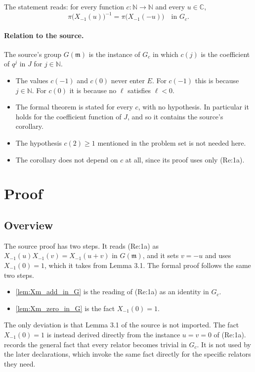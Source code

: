 \documentclass[11pt]{article}
\theoremstyle{definition}
\theoremstyle{remark}
\begin{document}
The statement reads: for every function $c:\mathbb{N}\to\mathbb{N}$ and every $u\in\mathbb{C}$,
\[
\pi\bigl(X_{-1}(u)\bigr)^{-1}=\pi\bigl(X_{-1}(-u)\bigr)\quad\text{in } G_c.
\]

\paragraph{Relation to the source.} The source's group $G(\mathfrak{m})$ is the instance of $G_c$ in which $c(j)$ is the coefficient of $q^j$ in $J$ for $j\in\mathbb{N}$.
\begin{itemize}
\item The values $c(-1)$ and $c(0)$ never enter $E$. For $c(-1)$ this is because $j\in\mathbb{N}$. For $c(0)$ it is because no $\ell$ satisfies $\ell<0$.
\item The formal theorem is stated for every $c$, with no hypothesis. In particular it holds for the coefficient function of $J$, and so it contains the source's corollary.
\item The hypothesis $c(2)\geq 1$ mentioned in the problem set is not needed here.
\item The corollary does not depend on $c$ at all, since its proof uses only (Re:1a).
\end{itemize}

\section{Proof}

\subsection{Overview}

The source proof has two steps. It reads (Re:1a) as $X_{-1}(u)X_{-1}(v)=X_{-1}(u+v)$ in $G(\mathfrak{m})$, and it sets $v=-u$ and uses $X_{-1}(0)=1$, which it takes from Lemma 3.1. The formal proof follows the same two steps.
\begin{itemize}
\item \cref{lem:Xm_add_in_G} is the reading of (Re:1a) as an identity in $G_c$.
\item \cref{lem:Xm_zero_in_G} is the fact $X_{-1}(0)=1$.
\end{itemize}
The only deviation is that Lemma 3.1 of the source is not imported. The fact $X_{-1}(0)=1$ is instead derived directly from the instance $u=v=0$ of (Re:1a).  records the general fact that every relator becomes trivial in $G_c$. It is not used by the later declarations, which invoke the same fact directly for the specific relators they need.
\end{document}
